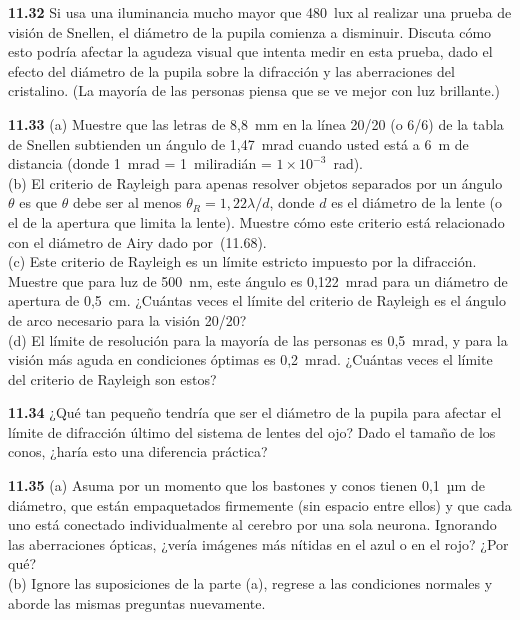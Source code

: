 \documentclass[12pt]{book}
\begin{document}
\textbf{11.32} Si usa una iluminancia mucho mayor que 480~lux al realizar una prueba de visión de Snellen, el diámetro de la pupila comienza a disminuir. Discuta cómo esto podría afectar la agudeza visual que intenta medir en esta prueba, dado el efecto del diámetro de la pupila sobre la difracción y las aberraciones del cristalino. (La mayoría de las personas piensa que se ve mejor con luz brillante.)

\textbf{11.33} (a) Muestre que las letras de 8,8~mm en la línea 20/20 (o 6/6) de la tabla de Snellen subtienden un ángulo de 1,47~mrad cuando usted está a 6~m de distancia (donde 1~mrad = 1~miliradián = $1\times10^{-3}$~rad).\\
(b) El criterio de Rayleigh para apenas resolver objetos separados por un ángulo $\theta$ es que $\theta$ debe ser al menos $\theta_R = 1{,}22\lambda/d$, donde $d$ es el diámetro de la lente (o el de la apertura que limita la lente). Muestre cómo este criterio está relacionado con el diámetro de Airy dado por~(11.68).\\
(c) Este criterio de Rayleigh es un límite estricto impuesto por la difracción. Muestre que para luz de 500~nm, este ángulo es 0,122~mrad para un diámetro de apertura de 0,5~cm. ¿Cuántas veces el límite del criterio de Rayleigh es el ángulo de arco necesario para la visión 20/20?\\
(d) El límite de resolución para la mayoría de las personas es 0,5~mrad, y para la visión más aguda en condiciones óptimas es 0,2~mrad. ¿Cuántas veces el límite del criterio de Rayleigh son estos?

\textbf{11.34} ¿Qué tan pequeño tendría que ser el diámetro de la pupila para afectar el límite de difracción último del sistema de lentes del ojo? Dado el tamaño de los conos, ¿haría esto una diferencia práctica?

\textbf{11.35} (a) Asuma por un momento que los bastones y conos tienen 0,1~µm de diámetro, que están empaquetados firmemente (sin espacio entre ellos) y que cada uno está conectado individualmente al cerebro por una sola neurona. Ignorando las aberraciones ópticas, ¿vería imágenes más nítidas en el azul o en el rojo? ¿Por qué?\\
(b) Ignore las suposiciones de la parte (a), regrese a las condiciones normales y aborde las mismas preguntas nuevamente.
\end{document}
